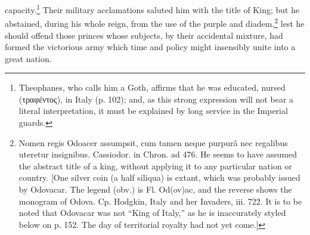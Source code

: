 capacity.\footnote{Theophanes, who calls him a Goth, affirms that he was educated, nursed (\textgreek{τραφέντος}), in Italy (p. 102); and, as this strong expression will not bear a literal interpretation, it must be explained by long service in the Imperial guards.} Their military acclamations saluted him with the title of King; but he abstained, during his whole reign, from the use of the purple and diadem,\footnote{Nomen regis Odoacer assumpsit, cum tamen neque purpurâ nec regalibus uteretur insignibus. Cassiodor. in Chron. ad 476. He seems to have assumed the abstract title of a king, without applying it to any particular nation or country. [One silver coin (a half siliqua) is extant, which was probably issued by Odovacar. The legend (obv.) is Fl. Od(ov)ac, and the reverse shows the monogram of Odova. Cp. Hodgkin, Italy and her Invaders, iii. 722. It is to be noted that Odovacar was not \texthebrew{“}King of Italy,\texthebrew{}” as he is inaccurately styled below on p. 152. The day of territorial royalty had not yet come.]} lest he should offend those princes whose subjects, by their accidental mixture, had formed the victorious army which time and policy might insensibly unite into a great nation.

